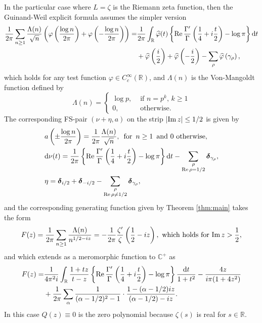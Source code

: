 \documentclass[a4paper,reqno,12pt]{amsart}
\renewcommand{\r}{\mathbb{R}}
\newcommand{\cp}{\mathbb{C}} %
\newcommand{\ft}{\widehat}
\newcommand{\bo}{\boldsymbol}
\newcommand{\ga}{\gamma}
\newcommand{\al}{\alpha}
\newcommand{\p}{\varphi}
\renewcommand{\d}{\mathrm{d}}
\newcommand{\cd}{\cdot}
\newcommand{\1}{{\bf 1}}
\newcommand{\del}{{\bo \delta}}
\renewcommand{\Re}{{\rm Re}\,}
\renewcommand{\Im}{{\rm Im}\,}
\begin{document}
In the particular case where $L=\zeta$ is the Riemann zeta function, then the Guinand-Weil explicit formula assumes the simpler version
\begin{align*}
    \frac{1}{2\pi}\sum_{n\geq1} \frac{\Lambda(n)}{\sqrt{n}}\left(\p\left(\frac{\log{n}}{2\pi}\right)+\p\left(-\frac{\log{n}}{2\pi}\right)\right)=&\frac{1}{2\pi}\int_{\r} \ft{\p}(t)\left\{\Re{\frac{\Gamma'}{\Gamma}\left(\frac{1}{4}+i\frac{t}{2}\right)}-\log{\pi}\right\}\d t\\
    &+\ft{\p}\left(\frac{i}{2}\right)+\ft{\p}\left(-\frac{i}{2}\right)-\sum_{\rho} \ft{\p}\left(\ga_\rho\right),
\end{align*}
which holds for any test function $\p\in C^\infty_c(\r)$, and $\Lambda(n)$ is the Von-Mangoldt function defined by
\begin{equation}
    \Lambda(n)=\begin{cases}
        \log{p}, & \text{ if } n=p^k,\, k\geq1\\
        0, & \text{ otherwise}.
    \end{cases}
\end{equation}
The corresponding FS-pair $(\nu+\eta,a)$ on the strip $|\Im{z}|\leq1/2$ is given by
\begin{align*}
    &a\left(\pm\frac{\log{n}}{2\pi}\right)=\frac{1}{2\pi}\frac{\Lambda(n)}{\sqrt{n}},\, \text{ for }\, n\geq1\, \text{ and } 0 \text{ otherwise,}\\
    &\d\nu(t)=\frac{1}{2\pi}\left\{\Re{\frac{\Gamma'}{\Gamma}\left(\frac{1}{4}+i\frac{t}{2}\right)}-\log{\pi}\right\}\d t-\sum_{\substack{\rho\\ \Re\rho=1/2}}\del_{\ga_\rho},\\
    &\eta=\del_{i/2}+\del_{-i/2}-\sum_{\substack{\rho\\ \Re\rho\neq1/2}}\del_{\ga_\rho},
\end{align*}
and the corresponding generating function given by Theorem \ref{thm:main} takes the form
\begin{align*}
    F(z)=\frac{1}{2\pi}\sum_{n\geq1} \frac{\Lambda(n)}{n^{1/2-iz}}=-\frac{1}{2\pi}\frac{\zeta'}{\zeta}\left(\frac{1}{2}-iz\right), \text{ which holds for } \Im{z}>\frac{1}{2},
\end{align*}
and which extends as a meromorphic function to $\cp^+$ as
\begin{align*}
    F(z)=&\frac{1}{4\pi^2 i}\int_{\r} \frac{1+tz}{t-z}\left\{\Re\frac{\Gamma'}{\Gamma}\left(\frac{1}{4}+i\frac{t}{2}\right)-\log{\pi}\right\}\frac{\d t}{1+t^2}-\frac{4z}{i\pi(1+4z^2)}\\
    &+\frac{1}{2\pi}\sum_{\al} \frac{1}{(\al-1/2)^2-1}\cd\frac{1-(\al-1/2)iz}{(\al-1/2)-iz}.
\end{align*}
In this case $Q(z)\equiv0$ is the zero polynomial because $\zeta(s)$ is real for $s\in\r$.
\end{document}
